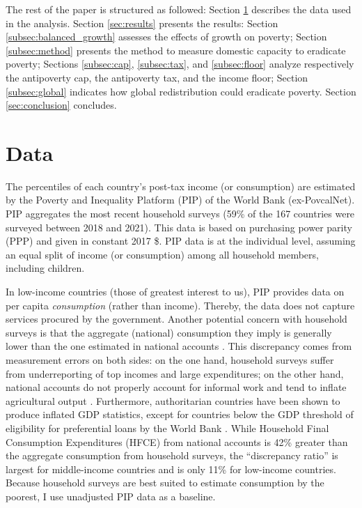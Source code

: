 \documentclass[12pt,english]{article}
\begin{document}
The rest of the paper is structured as followed: Section \ref{subsec:data} describes the data used in the analysis. Section \ref{sec:results} presents the results: Section \ref{subsec:balanced_growth} assesses the effects of growth on poverty; Section \ref{subsec:method} presents the method to measure domestic capacity to eradicate poverty; Sections \ref{subsec:cap}, \ref{subsec:tax}, and \ref{subsec:floor} analyze respectively the antipoverty cap, the antipoverty tax, and the income floor; Section \ref{subsec:global} indicates how global redistribution could eradicate poverty. Section \ref{sec:conclusion} concludes.

\section{Data}\label{subsec:data}
The percentiles of each country's post-tax income (or consumption) are estimated by the Poverty and Inequality Platform (PIP) of the World Bank (ex-PovcalNet). PIP aggregates the most recent household surveys (59\% of the 167 countries were surveyed between 2018 and 2021). This data is based on purchasing power parity (PPP) and given in constant 2017 \$. PIP data is %
at the individual level, assuming an equal split of income (or consumption) among all household members, including children. %

In low-income countries (those of greatest interest to us), PIP provides data on per capita \textit{consumption} (rather than income). Thereby, the data does not capture services procured by the government. 
Another potential concern with household surveys is that the aggregate (national) consumption they imply is generally lower than the one estimated in national accounts \citep{deaton_measuring_2005,prydz_disparities_2022,hlasny_impact_2022}. This discrepancy comes from measurement errors on both sides: on the one hand, household surveys suffer from underreporting of top incomes and large expenditures; on the other hand, national accounts do not properly account for informal work %
and tend to inflate agricultural output \citep{angrist_why_2021}. 
Furthermore, authoritarian countries have been shown to produce inflated GDP statistics, except for countries below the GDP threshold of eligibility for preferential loans by the World Bank \citep{martinez_how_2022}. %
While Household Final Consumption Expenditures (HFCE) from national accounts is 42\% greater than the aggregate consumption from household surveys, the ``discrepancy ratio'' is largest for middle-income countries and is only 11\% for low-income countries. 
Because household surveys are best suited to estimate consumption by the poorest, I use unadjusted PIP data as a baseline. 
\end{document}
